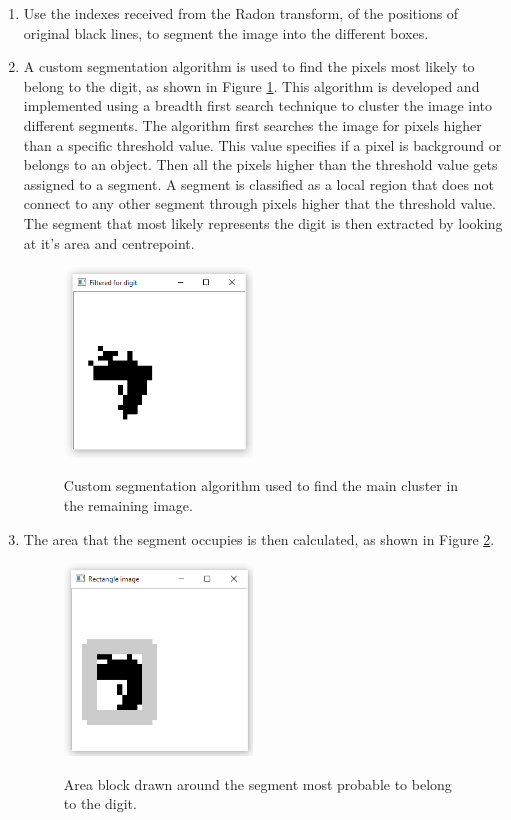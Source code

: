\begin{enumerate}
\item Use the indexes received from the Radon transform, of the positions of original black lines, to segment the image into the different boxes.
\item A custom segmentation algorithm is used to find the pixels most likely to belong to the digit, as shown in Figure \ref{fig:c}. This algorithm is developed and implemented using a breadth first search technique to cluster the image into different segments. The algorithm first searches the image for pixels higher than a specific threshold value. This value specifies if a pixel is background or belongs to an object. Then all the pixels higher than the threshold value gets assigned to a segment. A segment is classified as a local region that does not connect to any other segment through pixels higher that the threshold value. The segment that most likely represents the digit is then extracted by looking at it's area and centrepoint.
\begin{figure}
  \centering
  \includegraphics[width=5cm]{Cluster}\\
  \caption{Custom segmentation algorithm used to find the main cluster in the remaining image.}
  \label{fig:c}
\end{figure}

\item The area that the segment occupies is then calculated, as shown in Figure \ref{fig:areaLoc}.

\begin{figure}
  \centering
  \includegraphics[width=5cm]{DetectArea}\\
  \caption{Area block drawn around the segment most probable to belong to the digit.}
  \label{fig:areaLoc}
\end{figure}


\end{enumerate}
